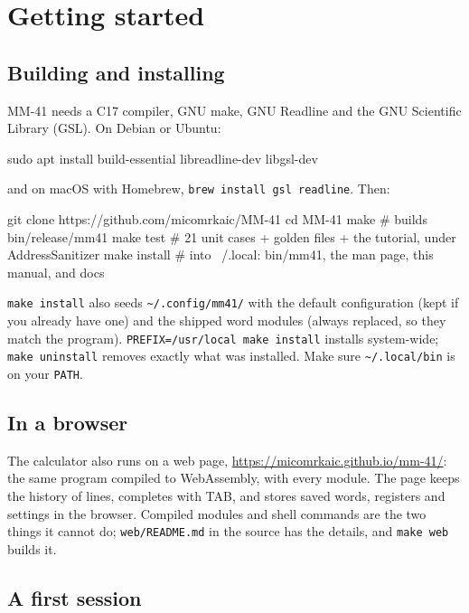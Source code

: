 \documentclass[11pt,letterpaper]{article}
\newcommand{\code}[1]{\texttt{#1}}
\begin{document}
\section{Getting started}

\subsection{Building and installing}

MM-41 needs a C17 compiler, GNU make, GNU Readline and the GNU Scientific Library (GSL). On Debian or Ubuntu:
\begin{shell}
sudo apt install build-essential libreadline-dev libgsl-dev
\end{shell}
and on macOS with Homebrew, \code{brew install gsl readline}. Then:
\begin{shell}
git clone https://github.com/micomrkaic/MM-41
cd MM-41
make              # builds bin/release/mm41
make test         # 21 unit cases + golden files + the tutorial, under AddressSanitizer
make install      # into ~/.local: bin/mm41, the man page, this manual, and docs
\end{shell}
\code{make install} also seeds \code{\textasciitilde/.config/mm41/} with the default configuration (kept if you already have one) and the shipped word modules (always replaced, so they match the program). \code{PREFIX=/usr/local make install} installs system-wide; \code{make uninstall} removes exactly what was installed. Make sure \code{\textasciitilde/.local/bin} is on your \code{PATH}.

\subsection{In a browser}

The calculator also runs on a web page, \url{https://micomrkaic.github.io/mm-41/}: the same program compiled to WebAssembly, with every module. The page keeps the history of lines, completes with TAB, and stores saved words, registers and settings in the browser. Compiled modules and shell commands are the two things it cannot do; \code{web/README.md} in the source has the details, and \code{make web} builds it.

\subsection{A first session}
\end{document}

